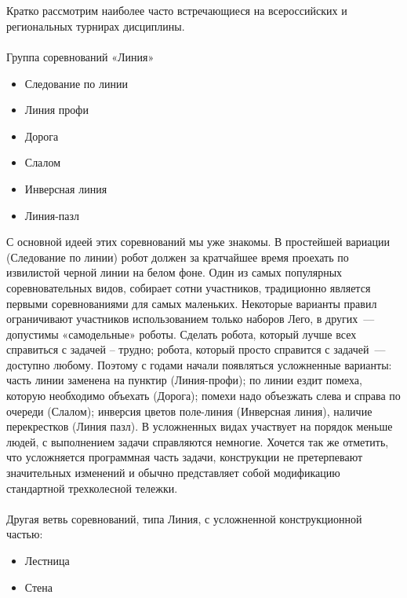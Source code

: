{\hypertarget{lesson30x3}{}}\\\\

Кратко рассмотрим наиболее часто встречающиеся на всероссийских и региональных турнирах дисциплины.\\\\

Группа соревнований «Линия»

\begin{itemize}
	\item Следование по линии
	\item Линия профи
	\item Дорога
	\item Слалом
	\item Инверсная линия
	\item Линия-пазл
\end{itemize}

С основной идеей этих соревнований мы уже знакомы. В простейшей вариации (Следование по линии)  робот должен за кратчайшее время проехать по извилистой черной линии на белом фоне. Один из самых популярных соревновательных видов, собирает сотни участников,  традиционно является первыми соревнованиями для самых маленьких.  Некоторые варианты правил ограничивают участников использованием только наборов Лего, в других~--- допустимы «самодельные» роботы. Сделать робота, который лучше всех справиться с задачей – трудно; робота, который просто справится с задачей~--- доступно любому. Поэтому с годами начали появляться усложненные варианты: часть линии заменена на пунктир (Линия-профи); по линии ездит помеха, которую необходимо объехать (Дорога); помехи надо объезжать слева и справа по очереди (Слалом); инверсия цветов поле-линия (Инверсная линия), наличие перекрестков (Линия пазл). В усложненных видах участвует на порядок меньше людей, с выполнением задачи справляются немногие. Хочется так же отметить, что  усложняется программная часть задачи, конструкции не претерпевают значительных изменений и обычно представляет собой модификацию стандартной трехколесной тележки.\\\\

Другая ветвь соревнований, типа Линия, с усложненной конструкционной частью:

\begin{itemize}
	\item Лестница
	\item Стена
\end{itemize}

